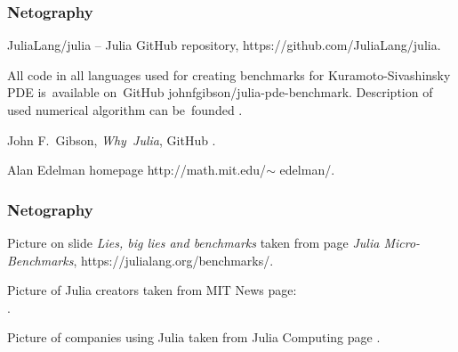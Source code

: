 \documentclass[10pt,t]{beamer}
\begin{document}
\begin{frame}
  \frametitle{Netography}


  JuliaLang/julia -- Julia GitHub repository,
  {https://github.com/JuliaLang/julia}.

  \vspace{0.3em}



  All code in all languages used for creating benchmarks for
  Kuramoto-Sivashinsky PDE is~available on~GitHub
  {johnfgibson/julia-pde-benchmark}. Description of used numerical
  algorithm can be~founded
  .

  \vspace{0.3em}



  John F.~Gibson, \textit{Why~Julia}, GitHub
  .

  \vspace{0.3em}



  Alan Edelman homepage 
  {http://math.mit.edu/$\sim$ edelman/}.

\end{frame}





\begin{frame}
  \frametitle{Netography}


  Picture on slide \textit{Lies, big lies and benchmarks} taken from
  page \textit{Julia Micro-Benchmarks},
  {https://julialang.org/benchmarks/}.

  \vspace{0.3em}



  Picture of Julia creators taken from MIT News page: \\
  .

  \vspace{0.3em}



  Picture of companies using Julia taken from Julia Computing page
  .

\end{frame}
\end{document}
